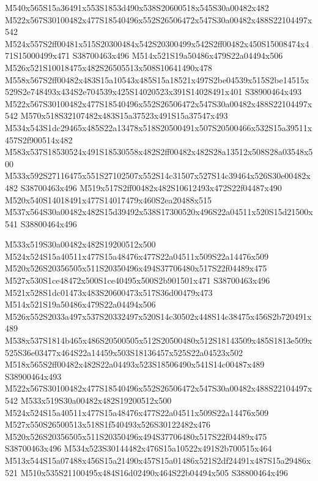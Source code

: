 \documentclass{article}
\begin{document}
\begin{multicols}{2}
M540x565S15a36491x553S1853d490x538S20600518x545S30a00482x482 M522x567S30100482x477S18540496x552S26506472x547S30a00482x488S22104497x542 M524x557S2ff00481x515S20300484x542S20300499x542S2ff00482x450S15008474x471S15000499x471 S38700463x496 M514x521S19a50486x479S22a04494x506 M526x521S10018475x482S26505513x508S10641490x478 M558x567S2ff00482x483S15a10543x485S15a18521x497S2be04539x515S2be14515x529S2e748493x434S2e704539x425S14020523x391S14028491x401 S38900464x493 M522x567S30100482x477S18540496x552S26506472x547S30a00482x488S22104497x542 M570x518S32107482x483S15a37523x491S15a37547x493 M534x543S1dc29465x485S22a13478x518S20500491x507S20500466x532S15a39511x457S2f900514x482 M583x537S18530524x491S18530558x482S2ff00482x482S28a13512x508S28a03548x500 M533x592S27116475x551S27102507x552S14c31507x527S14c39464x526S30e00482x482 S38700463x496 M519x517S2ff00482x482S10612493x472S22f04487x490 M520x540S14018491x477S14017479x460S2ea20488x515 M537x564S30a00482x482S15d39492x538S17300520x496S22a04511x520S15d21500x541 S38800464x496

M533x519S30a00482x482S19200512x500 M524x524S15a40511x477S15a48476x477S22a04511x509S22a14476x509 M520x526S20356505x511S20350496x494S37706480x517S22f04489x475 M527x530S1ce48472x500S1ce40495x500S2b901501x471 S38700463x496 M521x528S1dc01473x483S20600473x517S36d00479x473 M514x521S19a50486x479S22a04494x506 M526x552S2033a497x537S20332497x520S14c30502x448S14c38475x456S2b720491x489 M538x537S1814b465x486S20500505x512S20500480x512S18143509x485S1813e509x525S36e03477x464S22a14459x503S18136457x525S22a04523x502 M518x565S2ff00482x482S22a04493x523S18506490x541S14c00487x489 S38900464x493 M522x567S30100482x477S18540496x552S26506472x547S30a00482x488S22104497x542 M533x519S30a00482x482S19200512x500 M524x524S15a40511x477S15a48476x477S22a04511x509S22a14476x509 M527x550S26500513x518S1f540493x526S30122482x476 M520x526S20356505x511S20350496x494S37706480x517S22f04489x475 S38700463x496 M534x523S30144482x476S15a10522x491S2b700515x464 M513x544S15a07488x456S15a21490x457S15a01486x521S2df24491x487S15a29486x521 M510x535S21100495x484S16d02490x464S22b04494x505 S38800464x496


\end{multicols}
\end{document}
